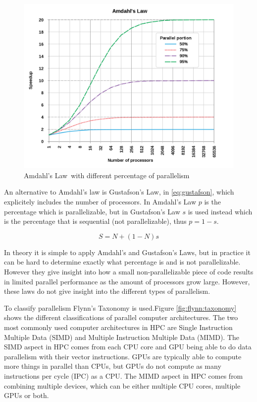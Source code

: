 \begin{figure}[H]
    \centering
    \includegraphics[scale=0.17]{Figures/amdahl.png}
    \caption[]{Amdahl's Law\protect\footnotemark\ with different percentage of parallelism}
    \label{fig:amdahl}
\end{figure} 

An alternative to Amdahl's law is Gustafson's Law, in \eqref{eq:gustafson}, which explicitely includes the number of processors. In Amdahl's Law $p$ is the percentage which is parallelizable, but in Gustafson's Law $s$ is used instead which is the percentage that is sequential (not parallelizable), thus $p = 1-s$.

\begin{equation}
  \label{eq:gustafson}
  S = N + (1 - N)s
\end{equation}

In theory it is simple to apply Amdahl's and Gustafson's Laws, but in practice it can be hard to determine exactly what percentage is and is not parallelizable. However they give insight into how a small non-parallelizable piece of code results in limited parallel performance as the amount of processors grow large. However, these laws do not give insight into the different types of parallelism.

To classify parallelism Flynn's Taxonomy is used.Figure \ref{fig:flynn:taxonomy} shows the different classifications of parallel computer architectures. The two most commonly used computer architectures in HPC are Single Instruction Multiple Data (SIMD) and Multiple Instruction Multiple Data (MIMD). The SIMD aspect in HPC comes from each CPU core and GPU being able to do data parallelism with their vector instructions. GPUs are typically able to compute more things in parallel than CPUs, but GPUs do not compute as many instructions per cycle (IPC) as a CPU. The MIMD aspect in HPC comes from combining multiple devices, which can be either multiple CPU cores, multiple GPUs or both.

